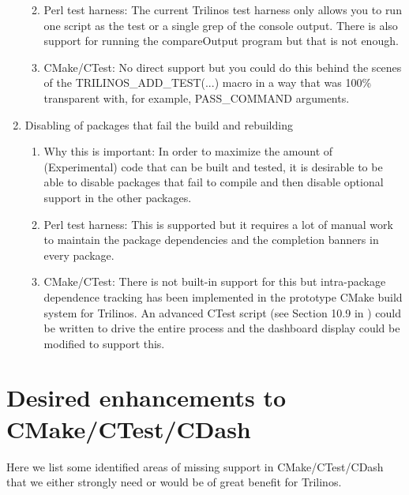 \documentclass[pdf,ps2pdf,11pt]{SANDreport}
\begin{document}
\begin{enumerate}
\begin{enumerate}
  {}\item Perl test harness: The current Trilinos test harness only
  allows you to run one script as the test or a single grep of the
  console output.  There is also support for running the compareOutput
  program but that is not enough.

  {}\item CMake/CTest: No direct support but you could do this behind
  the scenes of the TRILINOS\_ADD\_TEST(...) macro in a way that was
  100\% transparent with, for example, PASS\_COMMAND arguments.

  \end{enumerate}

{}\item Disabling of packages that fail the build and rebuilding

  \begin{enumerate}

  {}\item Why this is important: In order to maximize the amount of
  (Experimental) code that can be built and tested, it is desirable
  to be able to disable packages that fail to compile and then
  disable optional support in the other packages.

  {}\item Perl test harness: This is supported but it requires a lot
  of manual work to maintain the package dependencies and the
  completion banners in every package.

  {}\item CMake/CTest: There is not built-in support for this but
  intra-package dependence tracking has been implemented in the
  prototype CMake build system for Trilinos.  An advanced CTest script
  (see Section 10.9 in {}\cite{MasteringCMake_fourth}) could be
  written to drive the entire process and the dashboard display could
  be modified to support this.

  \end{enumerate}

\end{enumerate}

%
\section{Desired enhancements to CMake/CTest/CDash}
%

Here we list some identified areas of missing support in
CMake/CTest/CDash that we either strongly need or would be of great
benefit for Trilinos.
\end{document}
